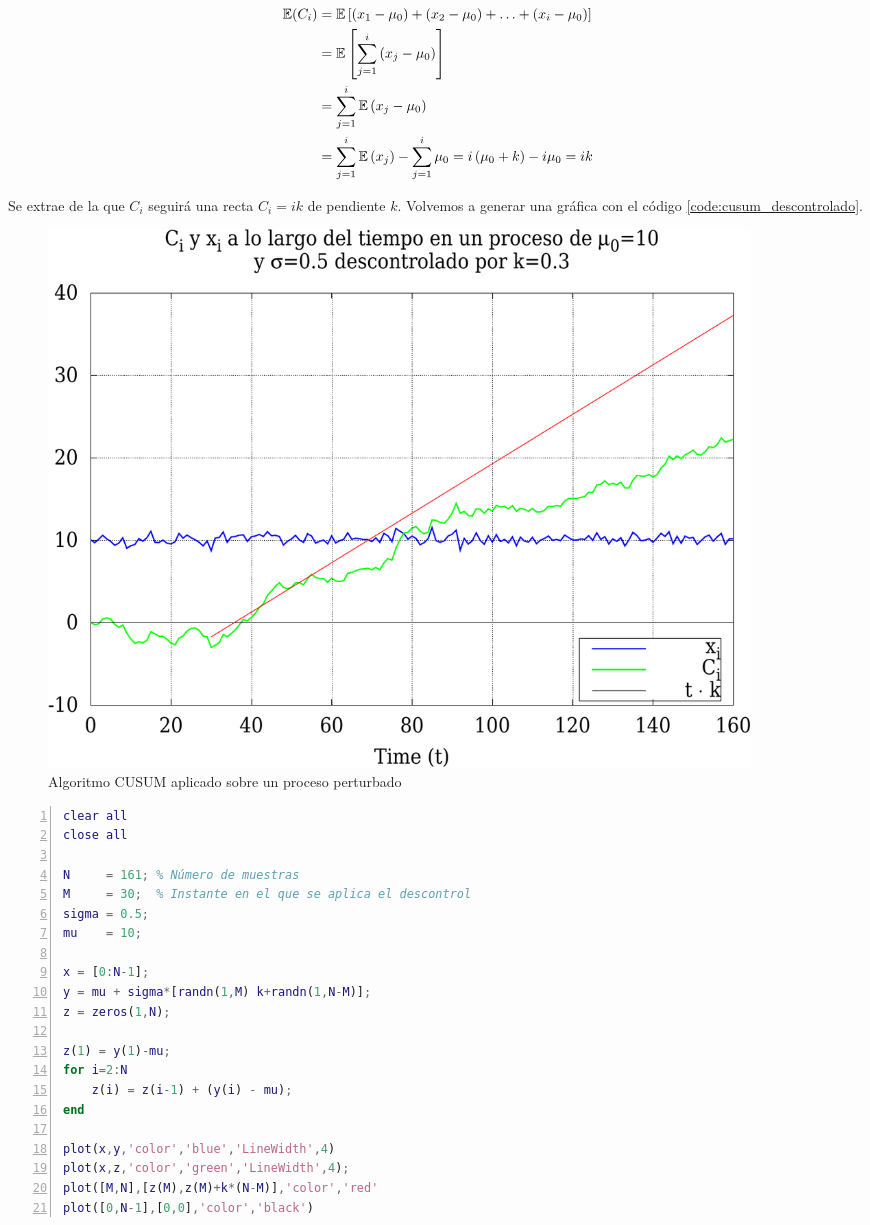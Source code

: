 \begin{align}
 \mathbb{E}(C_i) &= \mathbb{E}\left[\left(x_1 - \mu_0\right) + \left(x_2-\mu_0\right)+\hdots
                                                                             +\left(x_i-\mu_0\right)\right] \nonumber\\
                 &= \mathbb{E}\left[\sum_{j=1}^i\left(x_j-\mu_0\right)\right]                               \nonumber\\
                 &= \sum_{j=1}^i\mathbb{E}\left(x_j-\mu_0\right)                                            \nonumber\\
                 &= \sum_{j=1}^i\mathbb{E}\left(x_j\right) - \sum_{j=1}^i\mu_0 = i\left(\mu_0 + k\right) - i\mu_0 = ik
                                                                                             \LABEQ{cusum_descontrol}
\end{align}

Se extrae de la  que $C_i$ seguirá una recta $C_i=ik$ de pendiente $k$. Volvemos a generar una 
gráfica  con el código \autoref{code:cusum_descontrolado}.

\begin{figure}[htbp]
\centering
\includegraphics[width=0.9\textwidth]{CapituloCusum/Figuras/cusumDescontrolado-crop}
\caption{Algoritmo CUSUM aplicado sobre un proceso perturbado}
\end{figure}
%

\begin{lstlisting}[language=Matlab,caption={Algoritmo CUSUM en procesos perturbados}, breaklines=true, 
label=code:cusum_descontrolado,numbers=left,float=htbp]
clear all
close all

N     = 161; % Número de muestras
M     = 30;  % Instante en el que se aplica el descontrol
sigma = 0.5; 
mu    = 10;

x = [0:N-1];
y = mu + sigma*[randn(1,M) k+randn(1,N-M)];
z = zeros(1,N);

z(1) = y(1)-mu;
for i=2:N
    z(i) = z(i-1) + (y(i) - mu);
end

plot(x,y,'color','blue','LineWidth',4)
plot(x,z,'color','green','LineWidth',4);
plot([M,N],[z(M),z(M)+k*(N-M)],'color','red'
plot([0,N-1],[0,0],'color','black')
\end{lstlisting}

